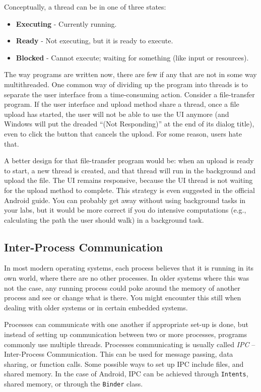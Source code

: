 Conceptually, a thread can be in one of three states:
\begin{itemize}
	\item \textbf{Executing} - Currently running.
	\item \textbf{Ready} - Not executing, but it is ready to execute.
	\item \textbf{Blocked} - Cannot execute; waiting for something (like input or resources).

\end{itemize}

The way programs are written now, there are few if any that are not in some way multithreaded. One common way of dividing up the program into threads is to separate the user interface from a time-consuming action. Consider a file-transfer program. If the user interface and upload method share a thread, once a file upload has started, the user will not be able to use the UI anymore (and Windows will put the dreaded ``(Not Responding)'' at the end of its dialog title), even to click the button that cancels the upload. For some reason, users hate that. 

A better design for that file-transfer program would be: when an upload is ready to start, a new thread is created, and that thread will run in the background and upload the file. The UI remains responsive, because the UI thread is not waiting for the upload method to complete. This strategy is even suggested in the official Android guide. You can probably get away without using background tasks in your labs, but it would be more correct if you do intensive computations (e.g., calculating the path the user should walk) in a background task.

\subsection*{Inter-Process Communication}
In most modern operating systems, each process believes that it is running in its own world, where there are no other processes. In older systems where this was not the case, any running process could poke around the memory of another process and see or change what is there. You might encounter this still when dealing with older systems or in certain embedded systems.

Processes can communicate with one another if appropriate set-up is done, but instead of setting up communication between two or more processes, programs commonly use multiple threads. Processes communicating is usually called \textit{IPC} -- Inter-Process Communication. This can be used for message passing, data sharing, or function calls. Some possible ways to set up IPC include files, and shared memory. In the case of Android, IPC can be achieved through \texttt{Intents}, shared memory, or through the \texttt{Binder} class.

